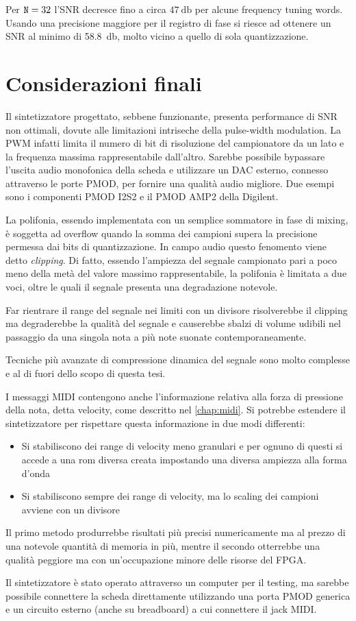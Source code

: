 Per $\texttt{N}=32$ l'SNR decresce fino a circa $\SI{47}{\decibel}$ per alcune
frequency tuning words. Usando una precisione maggiore per il registro di fase
si riesce ad ottenere un SNR al minimo di \SI{58.8}{\decibel}, molto vicino a quello di sola quantizzazione.

\section{Considerazioni finali}
Il sintetizzatore progettato, sebbene funzionante, presenta performance
di SNR non ottimali, dovute alle limitazioni intriseche della pulse-width 
modulation.
La PWM infatti limita il numero di bit di risoluzione del campionatore da un lato
e la frequenza massima rappresentabile dall'altro.
Sarebbe possibile bypassare l'uscita audio monofonica della scheda
e utilizzare un DAC esterno, connesso attraverso le porte PMOD, 
per fornire una qualità audio migliore.
Due esempi sono i componenti PMOD I2S2 e il PMOD AMP2 della Digilent.

La polifonia, essendo implementata con un semplice sommatore in fase 
di mixing, è soggetta ad overflow quando la somma dei campioni supera
la precisione permessa dai  bits di quantizzazione.
In campo audio questo fenomento viene detto \textit{clipping}.
Di fatto, essendo l'ampiezza del segnale campionato pari a poco meno
della metà del valore massimo rappresentabile, la polifonia è limitata
a due voci, oltre le quali il segnale presenta una degradazione
notevole.

Far rientrare il range del segnale nei limiti con un divisore risolverebbe
il clipping ma degraderebbe la qualità del segnale e causerebbe
sbalzi di volume udibili nel passaggio da una singola nota  a più note
suonate contemporaneamente.

Tecniche più avanzate di compressione dinamica del segnale 
sono molto complesse e al di fuori dello scopo di questa tesi.  

I messaggi MIDI contengono anche l'informazione relativa alla forza
di pressione della nota, detta velocity, come descritto nel \cref{chap:midi}.
Si potrebbe estendere il sintetizzatore per rispettare questa informazione
in due modi differenti:
\begin{itemize}
  \item Si stabiliscono dei range di velocity meno granulari  e per ognuno
        di questi si accede a una rom diversa creata impostando una diversa 
        ampiezza alla forma d'onda
  \item Si stabiliscono sempre dei range di velocity, ma lo scaling dei
        campioni avviene con un divisore
\end{itemize}
Il primo metodo produrrebbe risultati più precisi numericamente ma al
prezzo di una notevole quantità di memoria in più, mentre il secondo
otterrebbe una qualità peggiore ma con un'occupazione minore delle
risorse del FPGA.

Il sintetizzatore è stato operato attraverso un 
computer per il testing, ma sarebbe possibile connettere la scheda
direttamente utilizzando una porta PMOD generica e un circuito esterno
(anche su breadboard) a cui connettere il jack MIDI.
